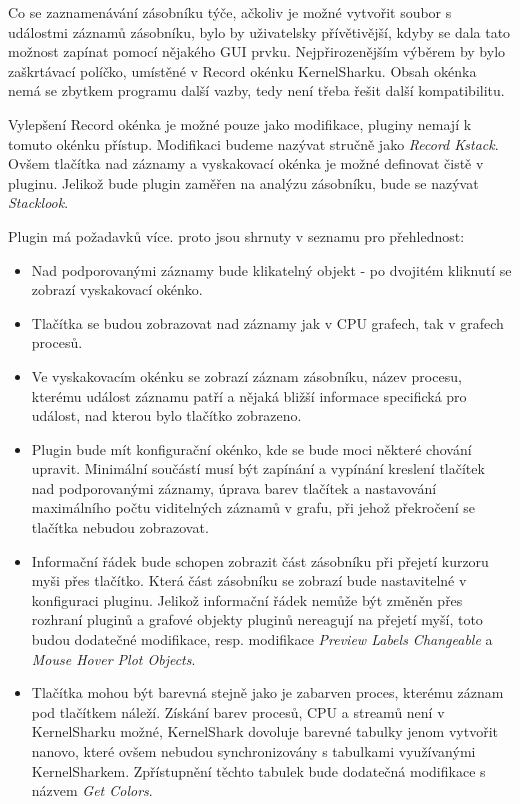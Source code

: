 Co se zaznamenávání zásobníku týče, ačkoliv je možné vytvořit soubor s událostmi záznamů zásobníku, bylo by uživatelsky přívětivější, kdyby se dala tato možnost zapínat pomocí nějakého GUI prvku. Nejpřirozenějším výběrem by bylo zaškrtávací políčko, umístěné v Record okénku KernelSharku. Obsah okénka nemá se zbytkem programu další vazby, tedy není třeba řešit další kompatibilitu.   

Vylepšení Record okénka je možné pouze jako modifikace, pluginy nemají k tomuto okénku přístup. Modifikaci budeme nazývat stručně jako \emph{Record Kstack}. Ovšem tlačítka nad záznamy a vyskakovací okénka je možné definovat čistě v pluginu. Jelikož bude plugin zaměřen na analýzu zásobníku, bude se nazývat \emph{Stacklook}.

Plugin má požadavků více. proto jsou shrnuty v seznamu pro přehlednost:
\begin{itemize}
    \item Nad podporovanými záznamy bude klikatelný objekt - po dvojitém kliknutí se zobrazí vyskakovací okénko.
    \item Tlačítka se budou zobrazovat nad záznamy jak v CPU grafech, tak v grafech procesů.
    \item Ve vyskakovacím okénku se zobrazí záznam zásobníku, název procesu, kterému událost záznamu patří a nějaká bližší informace specifická pro událost, nad kterou bylo tlačítko zobrazeno.
    \item Plugin bude mít konfigurační okénko, kde se bude moci některé chování upravit. Minimální součástí musí být zapínání a vypínání kreslení tlačítek nad podporovanými záznamy, úprava barev tlačítek a nastavování maximálního počtu viditelných záznamů v grafu, při jehož překročení se tlačítka nebudou zobrazovat.
    \item Informační řádek bude schopen zobrazit část zásobníku při přejetí kurzoru myši přes tlačítko. Která část zásobníku se zobrazí bude nastavitelné v konfiguraci pluginu. Jelikož informační řádek nemůže být změněn přes rozhraní pluginů a grafové objekty pluginů nereagují na přejetí myší, toto budou dodatečné modifikace, resp. modifikace \emph{Preview Labels Changeable} a \emph{Mouse Hover Plot Objects}.
    \item Tlačítka mohou být barevná stejně jako je zabarven proces, kterému záznam pod tlačítkem náleží. Získání barev procesů, CPU a streamů není v KernelSharku možné, KernelShark dovoluje barevné tabulky jenom vytvořit nanovo, které ovšem nebudou synchronizovány s tabulkami využívanými KernelSharkem. Zpřístupnění těchto tabulek bude dodatečná modifikace s názvem \emph{Get Colors}.
\end{itemize}

